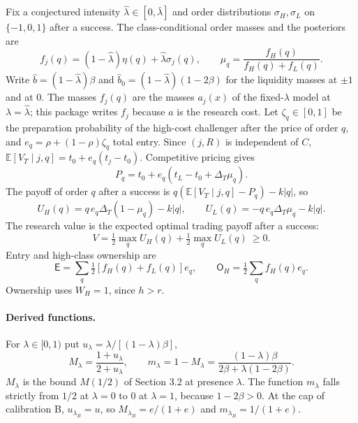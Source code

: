 \documentclass[12pt]{article}
\theoremstyle{definition}
\theoremstyle{remark}
\newcommand{\E}{\mathbb E}
\newcommand{\Ent}{\mathsf E}
\newcommand{\Own}{\mathsf O}
\newcommand{\DT}{\Delta_T}
\newcommand{\lh}{\hat\lambda}
\newcommand{\lb}{\bar\lambda}
\begin{document}
Fix a conjectured intensity $\lh\in[0,\lb]$ and order distributions $\sigma_H,\sigma_L$ on $\{-1,0,1\}$ after a
success. The class-conditional order masses and the posteriors are
\begin{equation}\label{eq:masses}
f_j(q)=(1-\lh)\eta(q)+\lh\sigma_j(q),\qquad \mu_q=\frac{f_H(q)}{f_H(q)+f_L(q)} .
\end{equation}
Write $\hat b=(1-\lh)\beta$ and $\hat b_0=(1-\lh)(1-2\beta)$ for the liquidity masses at $\pm1$ and at $0$. The
masses $f_j(q)$ are the masses $a_j(x)$ of the fixed-$\lambda$ model at $\lambda=\lh$; this package writes $f_j$
because $a$ is the research cost.
Let $\zeta_q\in[0,1]$ be the preparation probability of the high-cost challenger after the price of order $q$, and
$e_q=\rho+(1-\rho)\zeta_q$ total entry. Since $(j,R)$ is independent of $C$,
$\E[V_T\mid j,q]=t_0+e_q(t_j-t_0)$. Competitive pricing gives
\begin{equation}\label{eq:price}
P_q=t_0+e_q\left(t_L-t_0+\DT\mu_q\right).
\end{equation}
The payoff of order $q$ after a success is $q(\E[V_T\mid j,q]-P_q)-k|q|$, so
\begin{equation}\label{eq:payoffs}
U_H(q)=q\,e_q\DT(1-\mu_q)-k|q|,\qquad U_L(q)=-q\,e_q\DT\mu_q-k|q| .
\end{equation}
The research value is the expected optimal trading payoff after a success:
\begin{equation}\label{eq:V}
V=\tfrac12\max_q U_H(q)+\tfrac12\max_q U_L(q)\ \ge 0 .
\end{equation}
Entry and high-class ownership are
\begin{equation}\label{eq:entry}
\Ent=\sum_q \tfrac12\left[f_H(q)+f_L(q)\right]e_q,\qquad \Own_H=\tfrac12\sum_q f_H(q)e_q .
\end{equation}
Ownership uses $W_H=1$, since $h>r$.

\paragraph{Derived functions.} For $\lambda\in[0,1)$ put $u_\lambda=\lambda/[(1-\lambda)\beta]$,
\[
M_\lambda=\frac{1+u_\lambda}{2+u_\lambda},\qquad
m_\lambda=1-M_\lambda=\frac{(1-\lambda)\beta}{2\beta+\lambda(1-2\beta)} .
\]
$M_\lambda$ is the bound $M(1/2)$ of Section 3.2 at presence $\lambda$. The function $m_\lambda$ falls strictly from
$1/2$ at $\lambda=0$ to $0$ at $\lambda=1$, because $1-2\beta>0$. At the cap of calibration B,
$u_{\lambda_B}=u$, so $M_{\lambda_B}=e/(1+e)$ and $m_{\lambda_B}=1/(1+e)$.
\end{document}
